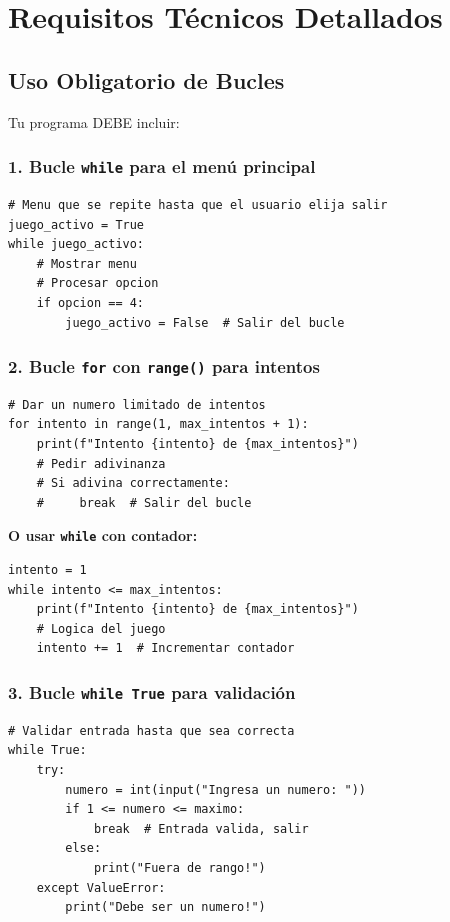 \documentclass[12pt,a4paper]{article}
\begin{document}
\newpage

\section{Requisitos Técnicos Detallados}

\subsection{Uso Obligatorio de Bucles}

Tu programa DEBE incluir:

\subsubsection{1. Bucle \texttt{while} para el menú principal}

\begin{lstlisting}
# Menu que se repite hasta que el usuario elija salir
juego_activo = True
while juego_activo:
    # Mostrar menu
    # Procesar opcion
    if opcion == 4:
        juego_activo = False  # Salir del bucle
\end{lstlisting}

\subsubsection{2. Bucle \texttt{for} con \texttt{range()} para intentos}

\begin{lstlisting}
# Dar un numero limitado de intentos
for intento in range(1, max_intentos + 1):
    print(f"Intento {intento} de {max_intentos}")
    # Pedir adivinanza
    # Si adivina correctamente:
    #     break  # Salir del bucle
\end{lstlisting}

\textbf{O usar \texttt{while} con contador:}

\begin{lstlisting}
intento = 1
while intento <= max_intentos:
    print(f"Intento {intento} de {max_intentos}")
    # Logica del juego
    intento += 1  # Incrementar contador
\end{lstlisting}

\subsubsection{3. Bucle \texttt{while True} para validación}

\begin{lstlisting}
# Validar entrada hasta que sea correcta
while True:
    try:
        numero = int(input("Ingresa un numero: "))
        if 1 <= numero <= maximo:
            break  # Entrada valida, salir
        else:
            print("Fuera de rango!")
    except ValueError:
        print("Debe ser un numero!")
\end{lstlisting}
\end{document}
